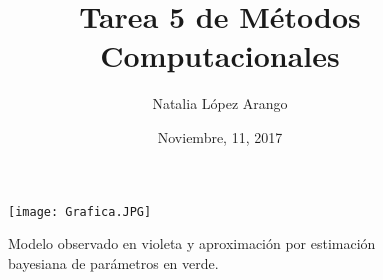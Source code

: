 \documentclass{article}
\title{Tarea 5 de Métodos Computacionales}
\author{Natalia López Arango}
\date{Noviembre, 11, 2017}
\begin{document}
\begin{figure}[!h]
{
	\texttt{[image: Grafica.JPG]}
	\caption{Modelo observado en violeta y aproximación por estimación bayesiana de parámetros en verde.}
}
\end{figure}
\end{document}
